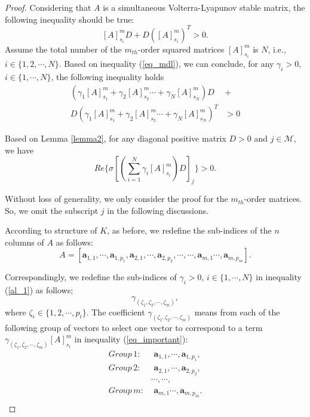 \documentclass{article}
\newtheorem{proof}{Proof}
\begin{document}
\begin{proof}
Considering that $A$ is a simultaneous Volterra-Lyapunov stable matrix, the following inequality should be true:
\begin{equation}\label{eq_mdl}
[A]^m_{s_i} D + D ([A]^m_{s_i})^T  > 0. 
\end{equation}
Assume the total number of the $m_{th}$-order squared matrices $[A]^m_{s_i}$ is $N$, i.e., $i \in \{1,2, \cdots, N\}$. Based on inequality (\ref{eq_mdl}), we can conclude, for any $\gamma_i>0$, $i \in \{1, \cdots, N\}$, the following inequality holds
\begin{equation} \label{al_1}
\begin{aligned}
(\gamma_1 [A]^m_{s_1} + \gamma_2 [A]^m_{s_2} \cdots + \gamma_N [A]^m_{s_N})D & +\\
 D (\gamma_1 [A]^m_{s_1} + \gamma_2 [A]^m_{s_2} \cdots + \gamma_N [A]^m_{s_N})^T & >0
\end{aligned}
\end{equation}

Based on Lemma \ref{lemma2}, for any diagonal positive matrix $D > 0$ and $j \in \mathcal{M}$, we have
\begin{equation}\label{eq_important}
Re\{ \sigma [ (\sum_{i=1}^{N} \gamma_i  [A]^m_{s_i})  D]_j \} >0.
\end{equation}

Without loss of generality, we only consider the proof for the $m_{th}$-order matrices. So, we omit the
subscript $j$ in the following discussions.

According to structure of $K$, as before, we redefine the sub-indices of the $n$ columns of $A$ as follows: 
$$A=[\boldsymbol{a}_{1,1}, \cdots, \boldsymbol{a}_{1,p_1}, \boldsymbol{a}_{2,1}, \cdots, \boldsymbol{a}_{2,p_2}, \cdots, \cdots, \boldsymbol{a}_{m,1} \cdots,\boldsymbol{a}_{m,p_m}].$$ 

Correspondingly, we redefine the sub-indices of $\gamma_i>0$, $i \in \{1, \cdots, N\}$ in inequality (\ref{al_1}) as follows;
\begin{equation}
\gamma_{(\zeta_1, \zeta_2, \cdots, \zeta_m)},    
\end{equation}
where $\zeta_i \in \{1,2,\cdots,p_i\}$. The coefficient $\gamma_{(\zeta_1, \zeta_2, \cdots, \zeta_m)}$ means from each of the following group of vectors to select one vector to correspond to a term $\gamma_{(\zeta_1, \zeta_2, \cdots, \zeta_m)} [A]^m_{s_i}$ in inequality  (\ref{eq_important}):
\begin{equation}
\begin{aligned}
 Group\,1: & \,\,  \boldsymbol{a}_{1,1}, \cdots, \boldsymbol{a}_{1,p_1},\\ 
 Group\,2:  & \,\, \boldsymbol{a}_{2,1}, \cdots, \boldsymbol{a}_{2,p_2}, \\
  &\cdots, \cdots, \\
 Group\,m: & \,\, \boldsymbol{a}_{m,1} \cdots,\boldsymbol{a}_{m,p_m}. \\   
\end{aligned}
\end{equation}


\end{proof}
\end{document}
